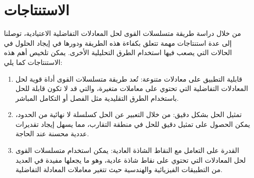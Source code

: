 \chapter*{الاستنتاجات}
من خلال دراسة طريقة متسلسلات القوى لحل المعادلات التفاضلية الاعتيادية، توصلنا إلى عدة استنتاجات مهمة تتعلق بكفاءة هذه الطريقة ودورها في إيجاد الحلول في الحالات التي يصعب فيها استخدام الطرق التحليلية الأخرى. يمكن تلخيص أهم هذه الاستنتاجات كما يلي:
\begin{enumerate}
	\item قابلية التطبيق على معادلات متنوعة: تُعد طريقة متسلسلات القوى أداة قوية لحل المعادلات التفاضلية التي تحتوي على معاملات متغيرة، والتي قد لا تكون قابلة للحل باستخدام الطرق التقليدية مثل الفصل أو التكامل المباشر.
	\item  تمثيل الحل بشكل دقيق: من خلال التعبير عن الحل كسلسلة لا نهائية من الحدود، يمكن الحصول على تمثيل دقيق للحل في منطقة التقارب، مما يسهل إيجاد تقديرات عددية محسنة عند الحاجة.
	\item 	القدرة على التعامل مع النقاط الشاذة العادية: يمكن استخدام متسلسلات القوى لحل المعادلات التي تحتوي على نقاط شاذة عادية، وهو ما يجعلها مفيدة في العديد من التطبيقات الفيزيائية والهندسية حيث تتغير معاملات المعادلة التفاضلية.
\end{enumerate}


